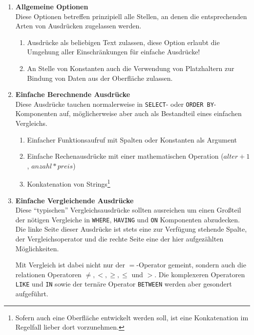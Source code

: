 \begin{enumerate}
\item \textbf{Allgemeine Optionen} \\
  Diese Optionen betreffen prinzipiell alle Stellen, an denen die entsprechenden Arten von Ausdrücken zugelassen werden.
  \begin{enumerate}
  \item \label{feat:expr-allow-any-text} Ausdrücke als beliebigen Text zulassen, diese Option erlaubt die Umgehung aller Einschränkungen für einfache Ausdrücke!
  \item \label{feat:expr-allow-placeholder} An Stelle von Konstanten auch die Verwendung von Platzhaltern zur Bindung von Daten aus der Oberfläche zulassen.
  \end{enumerate}

\item \label{feat:expr-compute}  \textbf{Einfache Berechnende Ausdrücke} \\
  Diese Ausdrücke tauchen normalerweise in \texttt{SELECT}- oder \texttt{ORDER BY}-Komponenten auf, möglicherweise aber auch als Bestandteil eines einfachen Vergleichs.
  \begin{enumerate}
      \item \label{feat:expr-compute-simple-func} Einfacher Funktionsaufruf mit Spalten oder Konstanten als Argument
      \item \label{feat:expr-compute-simple-arithmetic} Einfache Rechenausdrücke mit einer mathematischen Operation ($alter + 1$, $anzahl * preis$)
      \item \label{feat:expr-compute-simple-concat} Konkatenation von Strings\footnote{Sofern auch eine Oberfläche entwickelt werden soll, ist eine Konkatenation im Regelfall lieber dort vorzunehmen.}
  \end{enumerate}

\item \textbf{Einfache Vergleichende Ausdrücke} \\
  Diese ``typischen'' Vergleichsausdrücke sollten ausreichen um einen Großteil der nötigen Vergleiche in \texttt{WHERE}, \texttt{HAVING} und \texttt{ON} Komponenten abzudecken. Die linke Seite dieser Ausdrücke ist stets eine zur Verfügung stehende Spalte, der Vergleichsoperator und die rechte Seite eine der hier aufgezählten Möglichkeiten.

  Mit Vergleich ist dabei nicht nur der $=$-Operator gemeint, sondern auch die relationen Operatoren $\ne, <,\ge,\le$ und $>$. Die komplexeren Operatoren \texttt{LIKE} und \texttt{IN} sowie der ternäre Operator \texttt{BETWEEN} werden aber gesondert aufgeführt.


\end{enumerate}
